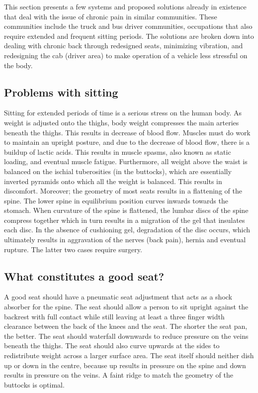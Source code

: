 \documentclass[11pt]{article}
\begin{document}
This section presents a few systems and proposed solutions already in existence that deal with the issue of
chronic pain in similar communities. These communities include the truck and bus driver communities, occupations 
that also require extended and frequent sitting periods. The solutions are broken down into dealing with chronic back 
through redesigned seats, minimizing vibration, and redesigning the cab (driver area) to make operation of a vehicle
less stressful on the body.

\subsection{Problems with sitting}
\label{sec:sittingproblems}

Sitting for extended periods of time is a serious stress on the human body. As weight is adjusted
onto the thighs, body weight compresses the main arteries beneath the thighs. This results in 
decrease of blood flow. Muscles must do work to maintain an upright posture, and due to the decrease 
of blood flow, there is a buildup of lactic acids. This results in muscle spasms, also known as static
loading, and eventual muscle fatigue. Furthermore, all weight above the waist is balanced on the ischial 
tuberosities (in the buttocks), which are essentially inverted pyramids onto which all the weight is 
balanced. This results in discomfort. Moreover; the geometry of most seats results in a flattening of the 
spine. The lower spine in equilibrium position curves inwards towards the stomach. When curvature of the 
spine is flattened, the lumbar discs of the spine compress together which in turn results in a migration of 
the gel that insulates each disc. In the absence of cushioning gel, degradation of the disc occurs, which 
ultimately results in aggravation of the nerves (back pain), hernia and eventual rupture. The latter two cases
require surgery\cite{ergoCentricAnatomy2011}.

\subsection{What constitutes a good seat?}
A good seat should have a pneumatic seat adjustment that acts as a shock absorber for the spine. The seat 
should allow a person to sit upright against the backrest with full contact while still leaving at least a 
three finger width clearance between the back of the knees and the seat. The shorter the seat pan, the better. 
The seat should waterfall downwards to reduce pressure on the veins beneath the thighs. The seat should also curve 
upwards at the sides to redistribute weight across a larger surface area. The seat itself should neither dish 
up or down in the centre, because up results in pressure on the spine and down results in pressure on the veins. 
A faint ridge to match the geometry of the buttocks is optimal\cite{ergoCentricchair2011, Natpost2005}.
\end{document}
